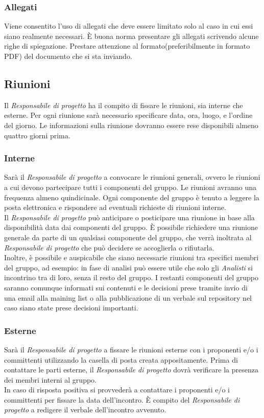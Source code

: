 		\subsubsection{Allegati}
Viene consentito l'uso di allegati che deve essere limitato solo al caso in cui essi siano realmente necessari. È buona norma presentare gli allegati scrivendo alcune righe di spiegazione. Prestare attenzione al formato(preferibilmente in formato \gls{PDF}) del documento che si sta inviando. 

	\subsection{Riunioni}
Il \textit{Responsabile di progetto} ha il compito di fissare le riunioni, sia interne che esterne. Per ogni riunione sarà necessario specificare data, ora, luogo, e l'ordine del giorno. Le informazioni sulla riunione dovranno essere rese disponibili almeno quattro giorni prima.
		\subsubsection{Interne}
Sarà il \textit{Responsabile di progetto} a convocare le riunioni generali, ovvero le riunioni a cui devono partecipare tutti i componenti del gruppo. Le riunioni avranno una frequenza almeno quindicinale. Ogni componente del gruppo è tenuto a leggere la posta elettronica e rispondere ad eventuali richieste di riunioni interne. \\
Il \textit{Responsabile di progetto} può anticipare o posticipare una riunione in base alla disponibilità data dai componenti del gruppo. È possibile richiedere una riunione generale da parte di un qualsiasi componente del gruppo, che verrà inoltrata al \textit{Responsabile di progetto} che può decidere se accoglierla o rifiutarla.\\
Inoltre, è possibile e auspicabile che siano necessarie riunioni tra specifici membri del gruppo, ad esempio: in fase di analisi può essere utile che solo gli \textit{Analisti} si incontrino tra di loro, senza il resto del gruppo. I restanti componenti del gruppo saranno comunque informati sui contenuti e le decisioni prese tramite invio di una email alla \gls{maining list} o alla pubblicazione di un \gls{verbale} sul \gls{repository} nel caso siano state prese decisioni importanti.
		\subsubsection{Esterne}
Sarà il \textit{Responsabile di progetto} a fissare le riunioni esterne con i proponenti e/o i committenti utilizzando la casella di posta creata appositamente. Prima di contattare le parti esterne, il \textit{Responsabile di progetto} dovrà verificare la presenza dei membri interni al gruppo. \\
In caso di risposta positiva si provvederà a contattare i proponenti e/o i committenti per fissare la data dell'incontro.
È compito del \textit{Responsabile di progetto} a redigere il \gls{verbale} dell'incontro avvenuto.

